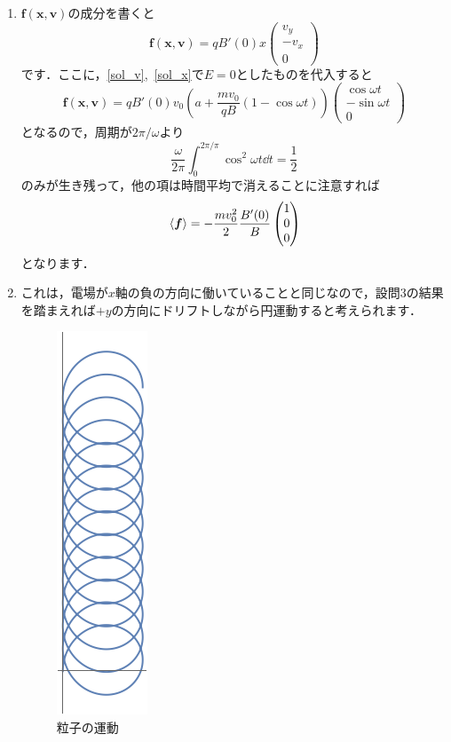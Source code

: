 \documentclass[a4paper,pdflatex,ja=standard]{bxjsarticle}
\begin{document}
\begin{enumerate}
  \item 

  $\bm{f}(\bm{x},\bm{v})$の成分を書くと
  \begin{equation}
    \bm{f}(\bm{x},\bm{v})
    =
    qB'(0)x
    \begin{pmatrix}
      v_y \\
      -v_x \\
      0  
    \end{pmatrix}
  \end{equation}
  です．ここに，\eqref{sol_v},\ \eqref{sol_x}で$E=0$としたものを代入すると
  \begin{equation}
    \bm{f}(\bm{x},\bm{v})
    =
    qB'(0)v_0
    \left( 
      a
      +
      \frac{mv_0}{qB}
      (1-\cos\omega t) 
    \right)
    \begin{pmatrix}
      \cos\omega t \\
      -\sin\omega t \\
      0
    \end{pmatrix}
  \end{equation}
  となるので，周期が$2\pi/\omega$より
  \begin{equation}
    \frac{\omega}{2\pi}
    \int_{0}^{2\pi/\pi}
    \cos^2\omega t
    \dd t
    =
    \frac{1}{2}
  \end{equation}
  のみが生き残って，他の項は時間平均で消えることに注意すれば
  \begin{equation}
    \ev*{\bm{f}}
    =
    -
    \frac{mv_0^2}{2}\frac{B'(0)}{B}
    \begin{pmatrix}
      1 \\
      0 \\
      0
    \end{pmatrix}
  \end{equation}
  となります．


  \item 

  これは，電場が$x$軸の負の方向に働いていることと同じなので，設問3の結果を踏まえれば$+y$の方向にドリフトしながら円運動すると考えられます．

  \begin{figure}[ht]    
    \centering
    \includegraphics[keepaspectratio, scale=0.6]{fig/fig1.png}
    \caption{粒子の運動}
  \end{figure}


\end{enumerate}
\end{document}
